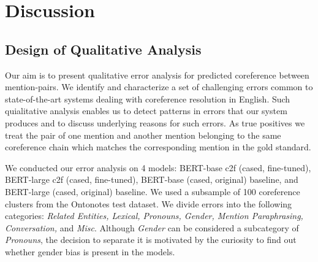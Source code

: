 \documentclass[11pt]{article}
\begin{document}
\section{Discussion}


\subsection{Design of Qualitative Analysis}

Our aim is to present qualitative error analysis for predicted coreference between mention-pairs. We identify and characterize a set of challenging errors common to state-of-the-art systems dealing with coreference resolution in English. Such quialitative analysis enables us to detect patterns in errors that our system produces and to discuss underlying reasons for such errors. As true positives we treat the pair of one mention and another mention belonging to the same coreference chain which matches the corresponding mention in the gold standard. 

We conducted our error analysis on 4 models: BERT-base c2f (cased, fine-tuned), BERT-large c2f (cased, fine-tuned), BERT-base (cased, original) baseline, and BERT-large (cased, original) baseline. We used a subsample of 100 coreference clusters from the Ontonotes test dataset. We divide errors into the following categories: \textit{Related Entities, Lexical, Pronouns, Gender, Mention Paraphrasing, Conversation,} and \textit{Misc}. Although \textit{Gender} can be considered a subcategory of \textit{Pronouns}, the decision to separate it is motivated by the curiosity to find out whether gender bias is present in the models. 
\end{document}
